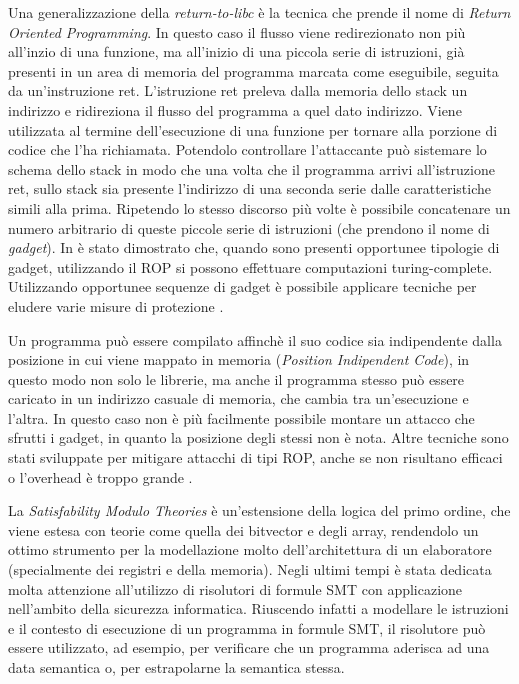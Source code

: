 Una generalizzazione della \emph{return-to-libc} è la tecnica che
prende il nome di \emph{Return Oriented
  Programming}\cite{Shacham-2007,Roemer-2012}. In questo caso il
flusso viene redirezionato non più all'inzio di una funzione, ma
all'inizio di una piccola serie di istruzioni, già presenti in un area
di memoria del programma marcata come eseguibile, seguita da
un'instruzione ret. L'istruzione ret preleva dalla memoria dello stack
un indirizzo e ridireziona il flusso del programma a quel dato
indirizzo. Viene utilizzata al termine dell'esecuzione di una funzione
per tornare alla porzione di codice che l'ha richiamata. Potendolo
controllare l'attaccante può sistemare lo schema dello stack in modo
che una volta che il programma arrivi all'istruzione ret, sullo stack
sia presente l'indirizzo di una seconda serie dalle caratteristiche
simili alla prima. Ripetendo lo stesso discorso più volte è possibile
concatenare un numero arbitrario di queste piccole serie di istruzioni
(che prendono il nome di \emph{gadget}). In \cite{roemer-12} è stato
dimostrato che, quando sono presenti opportunee tipologie di gadget,
utilizzando il ROP si possono effettuare computazioni
turing-complete. Utilizzando opportunee sequenze di gadget è possibile
applicare tecniche per eludere varie misure di protezione \cite{roglia:2009}.

Un programma può essere compilato affinchè il suo codice sia
indipendente dalla posizione in cui viene mappato in memoria
(\emph{Position Indipendent Code}), in questo modo non solo le
librerie, ma anche il programma stesso può essere caricato in un
indirizzo casuale di memoria, che cambia tra un'esecuzione e
l'altra. In questo caso non è più facilmente possibile montare un
attacco che sfrutti i gadget, in quanto la posizione degli stessi non
è nota. Altre tecniche sono stati sviluppate per mitigare attacchi di
tipi ROP, anche se non risultano efficaci o l'overhead è troppo grande
\cite{Davi-2014}.

La \emph{Satisfability Modulo Theories}\cite{Barrett-14} è
un'estensione della logica del primo ordine, che viene estesa con
teorie come quella dei bitvector e degli array, rendendolo un ottimo
strumento per la modellazione molto dell'architettura di un
elaboratore (specialmente dei registri e della memoria). Negli ultimi
tempi è stata dedicata molta attenzione all'utilizzo di risolutori di
formule SMT con applicazione nell'ambito della sicurezza\cite{}
informatica. Riuscendo infatti a modellare le istruzioni e il contesto
di esecuzione di un programma in formule SMT, il risolutore può essere
utilizzato, ad esempio, per verificare che un programma aderisca ad
una data semantica o, per estrapolarne la semantica stessa.

